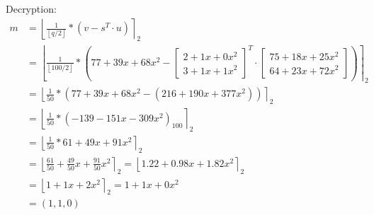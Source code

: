 Decryption:
\begin{align*}
  m & = \left\lfloor \frac{1}{\left\lfloor q/2\right\rfloor} *(v-s^T \cdot u)\right\rceil _2                                         \\
    & = \left\lfloor \frac{1}{\left\lfloor 100/2\right\rfloor} * \left (77+39x+68x^2-
  \begin{bmatrix}2+ 1x + 0x^2 \\ 3+1x+1x^2 \end{bmatrix}^T
  \cdot
  \begin{bmatrix}75+18x+25x^2 \\ 64+23x+72x^2 \end{bmatrix} \right )\right\rceil _2                                                  \\
    & = \left\lfloor \frac{1}{50} * (77+39x+68x^2-(216+190x+377x^2))\right\rceil _2                                                  \\
    & = \left\lfloor \frac{1}{50} * (-139-151x-309x^2)_{100}\right\rceil _2                                                          \\
    & = \left\lfloor \frac{1}{50} * 61+49x+91x^2\right\rceil _2                                                                      \\
    & = \left\lfloor \frac{61}{50} +\frac{49}{50}x+\frac{91}{50}x^2\right\rceil _2  = \left\lfloor 1.22+0.98x+1.82x^2\right\rceil _2 \\
    & = \left\lfloor1+1x+2x^2\right\rceil _2 =           1+1x+0x^2                                                                   \\
    &= (1,1,0)
\end{align*}